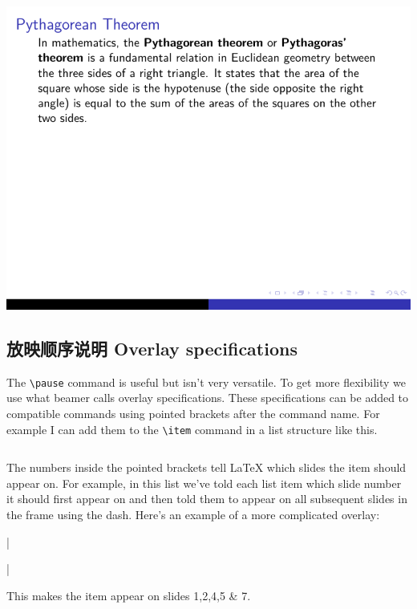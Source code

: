 \begin{column}{0.5\textwidth}
\includegraphics[page=4]{examples/beamer/beameroverlay02.pdf}

\subsection{放映顺序说明 Overlay specifications}

The \verb|\pause| command is useful but isn't very versatile. To get more flexibility we use what beamer calls overlay specifications. These specifications can be added to compatible commands using pointed brackets after the command name. For example I can add them to the \verb|\item| command in a list structure like this.

\inputminted[linenos=true]{latex}{examples/beamer/beameroverlay03.tex}

The numbers inside the pointed brackets tell LaTeX which slides the item should appear on. For example, in this list we've told each list item which slide number it should first appear on and then told them to appear on all subsequent slides in the frame using the dash. Here's an example of a more complicated overlay:

|\item<-2,4-5,7>|

This makes the item appear on slides 1,2,4,5 \& 7.


\end{column}
